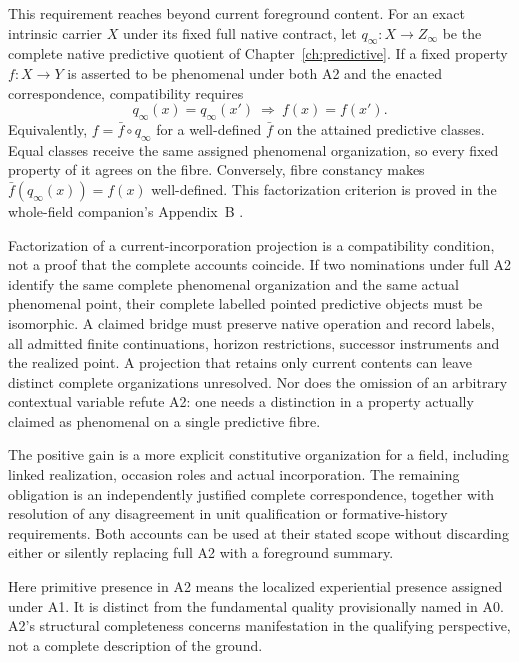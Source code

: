 This requirement reaches beyond current foreground content. For an exact intrinsic carrier $X$ under its fixed full native contract, let $q_\infty:X\to Z_\infty$ be the complete native predictive quotient of Chapter~\ref{ch:predictive}. If a fixed property $f:X\to Y$ is asserted to be phenomenal under both A2 and the enacted correspondence, compatibility requires
\[
 q_\infty(x)=q_\infty(x')\ \Longrightarrow\ f(x)=f(x').
\]
Equivalently, $f=\bar f\circ q_\infty$ for a well-defined $\bar f$ on the attained predictive classes. Equal classes receive the same assigned phenomenal organization, so every fixed property of it agrees on the fibre. Conversely, fibre constancy makes $\bar f(q_\infty(x))=f(x)$ well-defined. This factorization criterion is proved in the whole-field companion's Appendix~B \cite{RodgersWholeField2026}.

Factorization of a current-incorporation projection is a compatibility condition, not a proof that the complete accounts coincide. If two nominations under full A2 identify the same complete phenomenal organization and the same actual phenomenal point, their complete labelled pointed predictive objects must be isomorphic. A claimed bridge must preserve native operation and record labels, all admitted finite continuations, horizon restrictions, successor instruments and the realized point. A projection that retains only current contents can leave distinct complete organizations unresolved. Nor does the omission of an arbitrary contextual variable refute A2: one needs a distinction in a property actually claimed as phenomenal on a single predictive fibre.

The positive gain is a more explicit constitutive organization for a field, including linked realization, occasion roles and actual incorporation. The remaining obligation is an independently justified complete correspondence, together with resolution of any disagreement in unit qualification or formative-history requirements. Both accounts can be used at their stated scope without discarding either or silently replacing full A2 with a foreground summary.

Here primitive presence in A2 means the localized experiential presence assigned under A1. It is distinct from the fundamental quality provisionally named in A0. A2's structural completeness concerns manifestation in the qualifying perspective, not a complete description of the ground.

